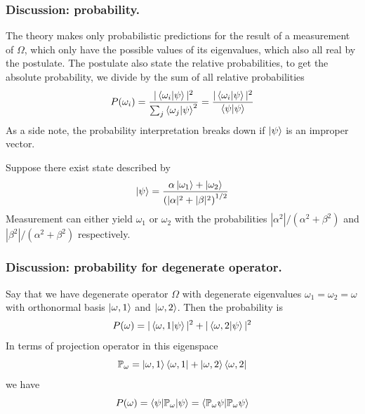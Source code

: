 \documentclass[../../../main.tex]{subfiles}
\begin{document}
\subsubsection{Discussion: probability.}
The theory makes only probabilistic predictions for the result of a measurement of $\Omega$, which only have the possible values of its eigenvalues, which also all real by the postulate.
The postulate also state the relative probabilities, to get the absolute probability, we divide by the sum of all relative probabilities
\begin{equation*}
    P(\omega_i)=\frac{|\braket{\omega_i|\psi}|^2 }{\sum_j \braket{\omega_j | \psi}^2}=\frac{|\braket{\omega_i|\psi}|^2}{\braket{\psi|\psi}}
\end{equation*}
As a side note, the probability interpretation breaks down if $\ket{\psi}$ is an improper vector.

Suppose there exist state described by
\begin{equation*}
    \ket{\psi}=\frac{\alpha \ket{\omega_1 }+\ket{\omega_2}}{\left( |\alpha|^2+|\beta|^2 \right)^{1/2} }
\end{equation*}
Measurement can either yield $\omega_1$ or $\omega_2$ with the probabilities $|\alpha^2|/(\alpha^2+\beta^2)$ and $|\beta^2|/(\alpha^2+\beta^2)$ respectively.

\subsubsection{Discussion: probability for degenerate operator.}
Say that we have degenerate operator $\Omega$ with degenerate eigenvalues $\omega_1=\omega_2=\omega$ with orthonormal basis $\ket{\omega,1}$ and $\ket{\omega,2}$.
Then the probability is
\begin{equation*}
    P(\omega)=|\braket{\omega,1|\psi}|^2+|\braket{\omega,2|\psi}|^2
\end{equation*}
In terms of projection operator in this eigenspace
\begin{equation*}
    \mathbb{P }_\omega=\ket{\omega,1}\bra{\omega,1}+\ket{\omega,2}\bra{\omega,2}
\end{equation*}
we have
\begin{equation*}
    P(\omega)=\braket{\psi|\mathbb{P}_\omega|\psi}=\braket{\mathbb{P}_\omega \psi|\mathbb{P}_\omega \psi}
\end{equation*}
\end{document}
